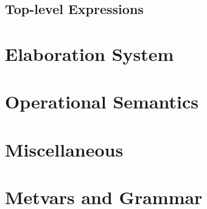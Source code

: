 \documentclass[11pt]{article}%
\newcommand{\TODO}[1]{}
\begin{document}
\subsection{Top-level Expressions}
\cndefnsexplXXtop%

\section{Elaboration System}
\cndefnsinfXXres%
\cndefnselabXXisXXexpr%
\cndefnselabXXspine%
\cndefnselabXXseqXXexpr%
\cndefnselabXXtop%

\section{Operational Semantics}
\cndefnssubsXXjudge%
\cndefnspureXXopsemXXdefns%
\cndefnsopsemXXdefns%

\section{Miscellaneous}
\cndefnsproofXXdefns%
\cndefnsspecXXdefns%
\cndefnsheapXXsat

\section{Metvars and Grammar}
\cnmetavars\\[\baselineskip]
\cngrammar%
\end{document}
